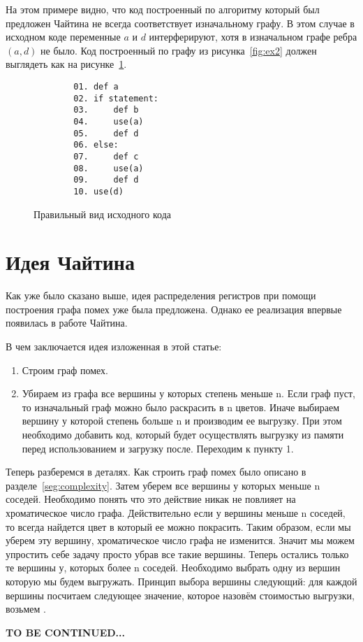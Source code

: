 \documentclass[12pt]{article}
\begin{document}
На этом примере видно, что код построенный по алгоритму который был предложен Чайтина не
всегда соответствует изначальному графу. В этом случае в исходном коде переменные
$a$ и $d$ интерферируют, хотя в изначальном графе ребра $(a, d)$ не было. Код построенный
по графу из рисунка~\ref{fig:ex2} должен выглядеть как на рисунке~\ref{fig:right_ex2}.

\begin{figure}[H]
    \centering
    \lstset{basicstyle=\ttfamily\small, frame=single}
    \begin{lstlisting}
        01. def a
        02. if statement:
        03.     def b
        04.     use(a)
        05.     def d 
        06. else:
        07.     def c
        08.     use(a)
        09.     def d
        10. use(d)
    \end{lstlisting}
    \caption{Правильный вид исходного кода}
    \label{fig:right_ex2}
\end{figure}

\section{Идея Чайтина}
Как уже было сказано выше, идея распределения регистров при помощи построения графа помех уже была
предложена. Однако ее реализация впервые появилась в работе Чайтина.

В чем заключается идея изложенная в этой статье:
\begin{enumerate}
    \item Строим граф помех.
    \item Убираем из графа все вершины у которых степень меньше n. Если граф пуст, то изначальный граф
    можно было раскрасить в n цветов. Иначе выбираем вершину у которой степень больше n и производим ее выгрузку.
    При этом необходимо добавить код, который будет осуществлять выгрузку из памяти перед использованием и загрузку после.
    Переходим к пункту 1.
\end{enumerate}

Теперь разберемся в деталях. Как строить граф помех было описано в разделе~\ref{seg:complexity}. Затем уберем все вершины
у которых меньше n соседей. Необходимо понять что это действие никак не повлияет на хроматическое число графа. Действительно
если у вершины меньше n соседей, то всегда найдется цвет в который ее можно покрасить. Таким образом, если мы уберем эту вершину,
хроматическое число графа не изменится. Значит мы можем упростить себе задачу просто убрав все такие вершины. Теперь остались
только те вершины у, которых более n соседей. Необходимо выбрать одну из вершин которую мы будем выгружать. Принцип выбора
вершины следующий: для каждой вершины посчитаем следующее значение, которое назовём стоимостью выгрузки, возьмем .

\textbf{TO BE CONTINUED...}
\end{document}
